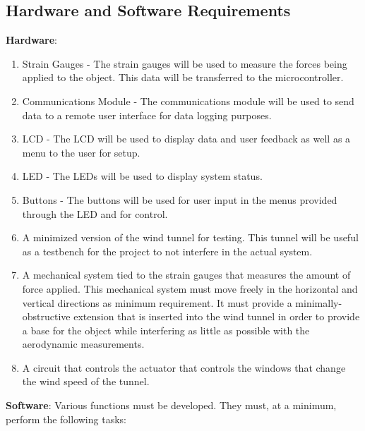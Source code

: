 	\subsection{Hardware and Software Requirements}
	\textbf{Hardware}:
		\begin{enumerate}
		
 		\item Strain Gauges - The strain gauges will be used to measure the forces being applied to the object. This data will be transferred to the microcontroller.

 		\item Communications Module - The communications module will be used to send data to a remote user interface for data logging purposes.

		\item LCD - The LCD will be used to display data and user feedback as well as a menu to the user for setup.

		\item LED - The LEDs will be used to display system status.

		\item Buttons - The buttons will be used for user input in the menus provided through the LED and for control.

		\item A minimized version of the wind tunnel for testing. This tunnel will be useful as a testbench for the project to not interfere in the actual system.

		\item A mechanical system tied to the strain gauges that measures the amount of force applied. This mechanical system must move freely in the horizontal and vertical directions as minimum requirement. It must provide a minimally-obstructive extension that is inserted into the wind tunnel in order to provide a base for the object while interfering as little as possible with the aerodynamic measurements.

		\item A circuit that controls the actuator that controls the windows that change the wind speed of the tunnel. 

	\end{enumerate}
	\textbf{Software}:
	Various functions must be developed. They must, at a minimum, perform the following tasks: 
